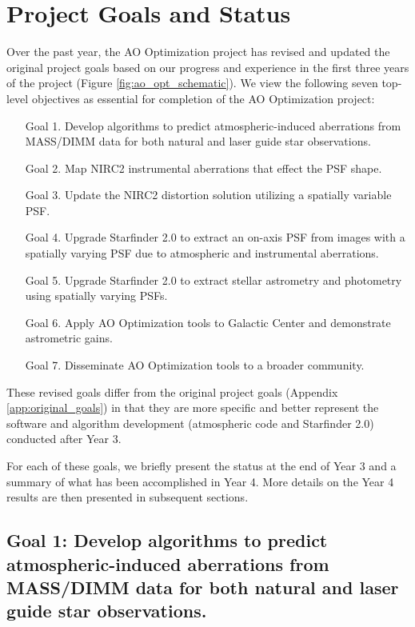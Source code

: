 \section{Project Goals and Status}
\label{sec:overview}

Over the past year, the AO Optimization project has revised and
updated the original project goals based on our progress and
experience in the first three years of the project 
(Figure \ref{fig:ao_opt_schematic}). We view the
following seven top-level objectives as essential for completion of
the AO Optimization project:
\begin{enumerate}
\item[Goal 1.] Develop algorithms to predict atmospheric-induced aberrations
  from MASS/DIMM data for both natural and laser guide star observations.
\item[Goal 2.] Map NIRC2 instrumental aberrations that effect the PSF shape.
\item[Goal 3.] Update the NIRC2 distortion solution utilizing a spatially
  variable PSF.
\item[Goal 4.] Upgrade Starfinder 2.0 to extract an on-axis PSF from images with
  a spatially varying PSF due to atmospheric and instrumental aberrations.
\item[Goal 5.] Upgrade Starfinder 2.0 to extract stellar astrometry and
  photometry using spatially varying PSFs.
\item[Goal 6.] Apply AO Optimization tools to Galactic Center and demonstrate
  astrometric gains.
\item[Goal 7.] Disseminate AO Optimization tools to a broader community.
\end{enumerate}
These revised goals differ from the original project goals 
(Appendix \ref{app:original_goals}) in that
they are more specific and better represent the software and
algorithm development (atmospheric code and Starfinder 2.0) conducted after Year
3. 


For each of these goals, we briefly present the status at the end of
Year 3 and a summary of what has been accomplished in Year 4. More
details on the Year 4 results are then presented in subsequent
sections.


\subsection{Goal 1: Develop algorithms to predict atmospheric-induced aberrations
  from MASS/DIMM data for both natural and laser guide star observations.}

